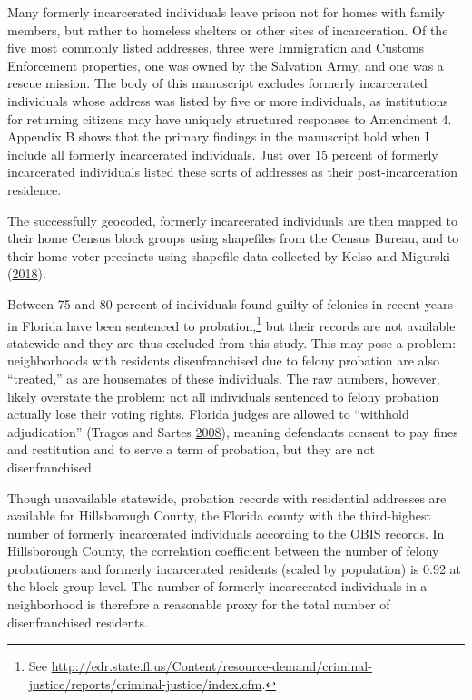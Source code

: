 \documentclass[
  12pt,
]{article}
\begin{document}
Many formerly incarcerated individuals leave prison not for homes with family members, but rather to homeless shelters or other sites of incarceration. Of the five most commonly listed addresses, three were Immigration and Customs Enforcement properties, one was owned by the Salvation Army, and one was a rescue mission. The body of this manuscript excludes formerly incarcerated individuals whose address was listed by five or more individuals, as institutions for returning citizens may have uniquely structured responses to Amendment 4. Appendix B shows that the primary findings in the manuscript hold when I include all formerly incarcerated individuals. Just over 15 percent of formerly incarcerated individuals listed these sorts of addresses as their post-incarceration residence.

The successfully geocoded, formerly incarcerated individuals are then mapped to their home Census block groups using shapefiles from the Census Bureau, and to their home voter precincts using shapefile data collected by Kelso and Migurski (\protect\hyperlink{ref-Kelso2018}{2018}).

Between 75 and 80 percent of individuals found guilty of felonies in recent years in Florida have been sentenced to probation,\footnote{See \url{http://edr.state.fl.us/Content/resource-demand/criminal-justice/reports/criminal-justice/index.cfm}.} but their records are not available statewide and they are thus excluded from this study. This may pose a problem: neighborhoods with residents disenfranchised due to felony probation are also ``treated,'' as are housemates of these individuals. The raw numbers, however, likely overstate the problem: not all individuals sentenced to felony probation actually lose their voting rights. Florida judges are allowed to ``withhold adjudication'' (Tragos and Sartes \protect\hyperlink{ref-Tragos2008}{2008}), meaning defendants consent to pay fines and restitution and to serve a term of probation, but they are not disenfranchised.

Though unavailable statewide, probation records with residential addresses are available for Hillsborough County, the Florida county with the third-highest number of formerly incarcerated individuals according to the OBIS records. In Hillsborough County, the correlation coefficient between the number of felony probationers and formerly incarcerated residents (scaled by population) is 0.92 at the block group level. The number of formerly incarcerated individuals in a neighborhood is therefore a reasonable proxy for the total number of disenfranchised residents.
\end{document}
